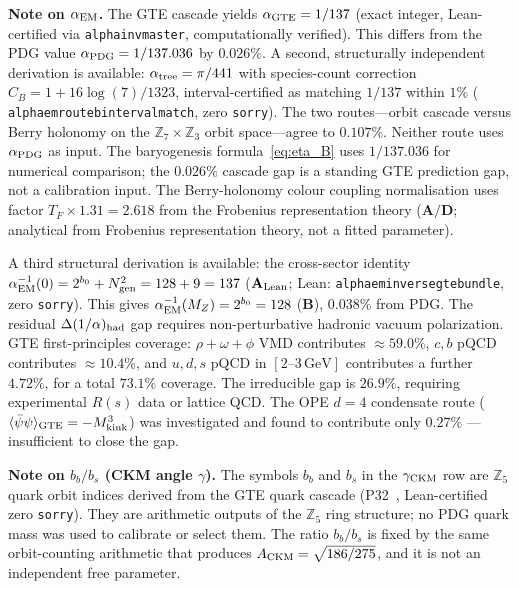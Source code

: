 \documentclass[11pt]{article}
\theoremstyle{remark}
\newcommand{\ZS}{\mathbb{Z}_7}
\newcommand{\Zfive}{\mathbb{Z}_5}
\newcommand{\Zthree}{\mathbb{Z}_3}
\newcommand{\lean}[1]{%
  \penalty-100
  \begingroup\def\_{\textunderscore\allowbreak}\texttt{#1}\endgroup}
\newcommand{\CatAL}{\ensuremath{\textbf{A}_{\rm Lean}}}
\newcommand{\CatAD}{\textbf{A/D}}
\newcommand{\CatB}{\textbf{B}}
\begin{document}
\noindent\textbf{Note on $\alpha_{\rm EM}$.}
The GTE cascade yields $\alpha_{\rm GTE} = 1/137$ (exact integer, Lean-certified via
\lean{alpha\_inv\_master}, computationally verified).
This differs from the PDG value $\alpha_{\rm PDG} = 1/137.036$ by $0.026\%$.
A second, structurally independent derivation is available:
$\alpha_{\rm tree} = \pi/441$ with species-count correction
$C_B = 1 + 16\log(7)/1323$, interval-certified as matching $1/137$ within $1\%$
(\lean{alpha\_em\_route\_b\_interval\_match}, zero \texttt{sorry}).
The two routes---orbit cascade versus Berry holonomy on the $\ZS \times \Zthree$
orbit space---agree to $0.107\%$.
Neither route uses $\alpha_{\rm PDG}$ as input.
The baryogenesis formula~\eqref{eq:eta_B} uses $1/137.036$ for numerical
comparison; the $0.026\%$ cascade gap is a standing GTE prediction gap, not a
calibration input.
The Berry-holonomy colour coupling normalisation uses factor
$T_F \times 1.31 = 2.618$ from the Frobenius representation theory
($\CatAD$; analytical from Frobenius representation theory, not a fitted parameter).

A third structural derivation is available: the cross-sector identity
$\alpha_{\rm EM}^{-1}(0) = 2^{b_0} + N_{\rm gen}^2 = 128 + 9 = 137$
($\CatAL$; Lean: \lean{alpha\_em\_inverse\_gte\_bundle}, zero \texttt{sorry}).
This gives $\alpha_{\rm EM}^{-1}(M_Z) = 2^{b_0} = 128$ ($\CatB$), 0.038\% from PDG.
The residual $\Delta(1/\alpha)_{\rm had}$ gap requires non-perturbative hadronic
vacuum polarization.  GTE first-principles coverage: $\rho{+}\omega{+}\phi$ VMD
contributes $\approx59.0\%$, $c,b$ pQCD contributes $\approx10.4\%$, and
$u,d,s$ pQCD in $[2\text{--}3\,\mathrm{GeV}]$ contributes a further $4.72\%$,
for a total $73.1\%$ coverage.  The irreducible gap is $26.9\%$, requiring
experimental $R(s)$ data or lattice QCD.
The OPE $d{=}4$ condensate route ($\langle\bar\psi\psi\rangle_{\rm GTE} = -M_{\rm kink}^3$)
was investigated and found to contribute only $0.27\%$ --- insufficient to close the gap.

\noindent\textbf{Note on $b_b/b_s$ (CKM angle $\gamma$).}
The symbols $b_b$ and $b_s$ in the $\gamma_{\rm CKM}$ row are
$\mathbb{Z}_5$ quark orbit indices derived from the GTE quark cascade
(P32~\cite{SpivackCKM}, Lean-certified zero \texttt{sorry}).
They are arithmetic outputs of the $\Zfive$ ring structure; no PDG quark mass
was used to calibrate or select them.  The ratio $b_b/b_s$ is fixed by the same
orbit-counting arithmetic that produces $A_{\rm CKM}=\sqrt{186/275}$, and it is
not an independent free parameter.
\end{document}
